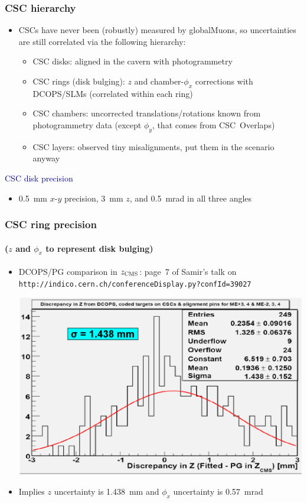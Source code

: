 \documentclass[compress]{beamer}
\begin{document}
\begin{frame}
\frametitle{CSC hierarchy}
\begin{itemize}
\item CSCs have never been (robustly) measured by globalMuons, so uncertainties are still correlated via the following hierarchy:
\begin{itemize}\setlength{\itemsep}{0.2 cm}
\item CSC disks: aligned in the cavern with photogrammetry 
\item CSC rings (disk bulging): $z$ and chamber-$\phi_x$ corrections with DCOPS/SLMs (correlated within each ring)
\item CSC chambers: uncorrected translations/rotations known from photogrammetry data (except $\phi_y$, that comes from \mbox{CSC Overlaps)\hspace{-1 cm}}
\item CSC layers: observed tiny misalignments, put them in the scenario anyway
\end{itemize}
\end{itemize}

\vfill
\hspace{-0.83 cm} \textcolor{darkblue}{\Large CSC disk precision}

\begin{itemize}
\item 0.5~mm $x$-$y$ precision, 3~mm $z$, and 0.5~mrad in all three angles
\end{itemize}
\end{frame}

\begin{frame}
\frametitle{CSC ring precision}
\framesubtitle{($z$ and $\phi_x$ to represent disk bulging)}
\begin{itemize}
\item DCOPS/PG comparison in $z_{\mbox{\scriptsize CMS}}$:  page~7 of Samir's talk on {\tt \scriptsize http://indico.cern.ch/conferenceDisplay.py?confId=39027}

\begin{center}
\includegraphics[width=0.8\linewidth]{dcops_in_z_replacement.png}
\end{center}

\item Implies $z$ uncertainty is 1.438~mm and $\phi_x$ uncertainty is 0.57~mrad
\end{itemize}
\end{frame}
\end{document}
